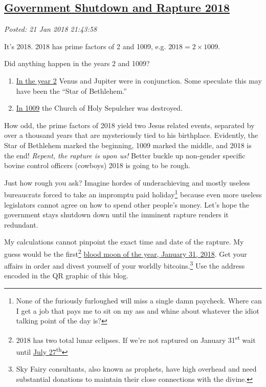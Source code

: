 %

\subsection*{\href{http://analyzethedatanotthedrivel.org/2018/01/21/government-shutdown-and-rapture-2018/}{Government Shutdown and Rapture 2018}}


\noindent\emph{Posted: 21 Jan 2018 21:43:58}
\vspace{6pt}

It's 2018. 2018 has prime factors of 2 and 1009, e.g. $2018 = 2 \times 1009$.

\medskip

Did anything happen in the years 2 and 1009?

\begin{enumerate}
\def\labelenumi{\arabic{enumi}.}
\item
  \href{https://www.onthisday.com/events/date/2}{In the year 2} Venus
  and Jupiter were in conjunction. Some speculate this may have been the
  ``Star of Bethlehem.''
\item
  \href{https://www.onthisday.com/events/october/18}{In 1009} the Church
  of Holy Sepulcher was destroyed.
\end{enumerate}

How odd, the prime factors of 2018 yield two Jesus related events,
separated by over a thousand years that are mysteriously tied to his
birthplace. Evidently, the Star of Bethlehem marked the beginning, 1009
marked the middle, and 2018 is the end! \emph{Repent, the rapture is
upon us!} Better buckle up non-gender specific bovine control officers
(cowboys) 2018 is going to be rough.

Just how rough you ask? Imagine hordes of underachieving and mostly
useless bureaucrats forced to take an impromptu paid
holiday\footnote{None of the furiously furloughed will miss a single damn paycheck.
 Where can I get a job that pays me to sit on my ass and whine about
 whatever the idiot talking point of the day
 is?
} because even more
useless legislators cannot agree on how to spend other people's money.
Let's hope the government stays shutdown down until the imminent rapture
renders it redundant.

My calculations cannot pinpoint the exact time and date of the rapture.
My guess would be the first\footnote{2018 has two total lunar eclipses. If we're not
 raptured on January 31\textsuperscript{st} wait until
 \href{https://eclipse.gsfc.nasa.gov/LEplot/LEplot2001/LE2018Jul27T.pdf}{July
 27\textsuperscript{th}}
}
\href{https://eclipse.gsfc.nasa.gov/LEplot/LEplot2001/LE2018Jan31T.pdf}{blood
moon of the year, January 31, 2018}. Get your affairs in order and
divest yourself of your worldly
bitcoins.\footnote{Sky Fairy consultants, also known as prophets, have high overhead and
 need substantial donations to maintain their close connections with
 the divine.
} Use the address
encoded in the QR graphic of this blog.

